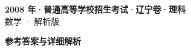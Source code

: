 \documentclass[zihao=-4, a4paper]{ctexart}
\begin{document}
\begin{center}
  {\Large\bfseries 2008 年·普通高等学校招生考试·辽宁卷·理科}\\[4pt]
  {\large 数学 · 解析版}
\end{center}
\medskip
{}

\clearpage
{}
\begin{center}{\Large\bfseries 参考答案与详细解析}\end{center}
\medskip

\end{document}
